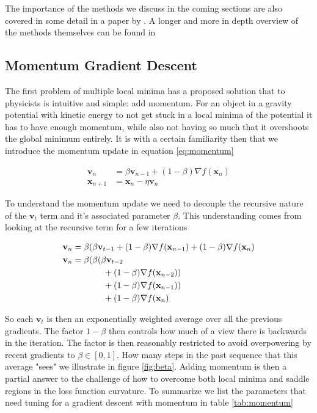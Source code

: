 The importance of the methods we discuss in the coming sections are also covered in some detail in a paper by \citet{Sutskever2013}. A longer and more in depth overview of the methods themselves can be found in \citet{Ruder}

\subsection{Momentum Gradient Descent}\label{sec:momentum_gd}

The first problem of multiple local minima has a proposed solution that to physicists is intuitive and simple: add momentum. For an object in a gravity potential with kinetic energy to not get stuck in a local minima of the potential it has to have enough momentum, while also not having so much that it overshoots the global minimum entirely. It is with a certain familiarity then that we introduce the momentum update in equation \ref{eq:momentum}

\begin{equation}\label{eq:momentum}
\begin{split}
\mathbf{v}_n &= \beta \mathbf{v}_{n-1} + (1 - \beta) \nabla f(\mathbf{x}_{n}) \\
\mathbf{x}_{n+1} &= \mathbf{x}_n - \eta\mathbf{v}_n 
\end{split}
\end{equation}


\noindent To understand the momentum update we need to decouple the recursive nature of the $\mathbf{v}_t$ term and it's associated parameter $\beta$. This understanding comes from looking at the recursive term for a few iterations

\begin{align*}
\mathbf{v}_n &= \beta(\beta \mathbf{v}_{t-1} + (1-\beta)\nabla f(\mathbf{x}_{n-1})+ (1-\beta)\nabla f(\mathbf{x}_{n}) \\
\mathbf{v}_n &= \beta(\beta (\beta \mathbf{v}_{t-2} \\& \hspace{0.5in}+ (1-\beta)\nabla f(\mathbf{x}_{n-2})) \\& \hspace{0.5in}+ (1-\beta)\nabla f(\mathbf{x}_{n-1})) \\& \hspace{0.5in}+ (1-\beta)\nabla f(\mathbf{x}_{n})
\end{align*}

\noindent So each $\mathbf{v}_t$ is then an exponentially weighted average over all the previous gradients. The factor $1-\beta$ then controls how much of a view there is backwards in the iteration. The factor is then reasonably restricted to avoid overpowering by recent gradients to $\beta \in [0, 1]$. How many steps in the past sequence that this average "sees" we illustrate in figure \ref{fig:beta}. Adding momentum is then a partial answer to the challenge of how to overcome both local minima and saddle regions in the loss function curvature. To summarize we list the parameters that need tuning for a gradient descent with momentum in table \ref{tab:momentum}


